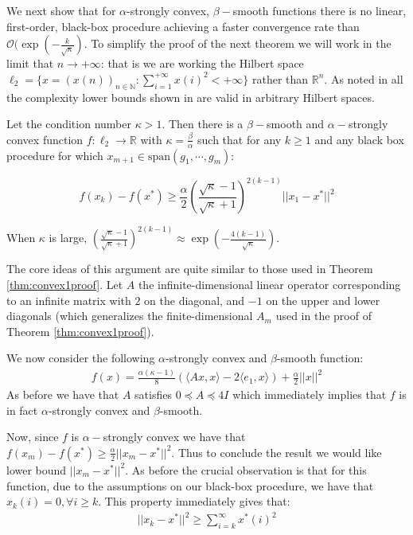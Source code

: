 We next show that for $\alpha$-strongly convex, $\beta-$smooth functions there is no linear, first-order, black-box procedure achieving a faster convergence rate than $\mathcal{O}(\exp(-\frac{k}{\sqrt{\kappa}})$. To simplify the proof of the next theorem we will work in the limit that $n \to +\infty$: that is we are working the Hilbert space $\ell_2 = \{ x = (x(n))_{n \in \mathbb{N}} : \sum_{i=1}^{+\infty} x(i)^2 < + \infty \}$ rather than $\mathbb{R}^n$. As noted in \citet{DBLP:journals/ftml/Bubeck15} all the complexity lower bounds shown in \citet{nesterov2004introductory} are valid in arbitrary Hilbert spaces.


\begin{theorem}
Let the condition number $\kappa > 1$. Then there is a $\beta-$smooth and $\alpha-$strongly convex function $f: \ell_2 \rightarrow \mathbb{R}$ with $\kappa = \frac{\beta}{\alpha}$ such that for any $k \geq 1$ and any black box procedure for which $x_{m+1} \in \text{span}(g_1, \cdots, g_m)$:

\begin{equation}
f(x_k) - f(x^*) \geq \frac{\alpha}{2} \left(\frac{ \sqrt{\kappa}-1}{\sqrt{\kappa}+1}\right)^{2(k-1)} ||x_1 - x^*||^2
\end{equation}

When $\kappa$ is large, $\left(\frac{ \sqrt{\kappa}-1}{\sqrt{\kappa}+1}\right)^{2(k-1)} \approx \exp( -\frac{4(k-1)}{\sqrt{\kappa}})$.
\end{theorem}

\proofstart

The core ideas of this argument are quite similar to those used in Theorem \ref{thm:convex1proof}. Let $A$ the infinite-dimensional linear operator corresponding to an infinite matrix with $2$ on the diagonal, and $-1$ on the upper and lower diagonals (which generalizes the finite-dimensional $A_m$ used in the proof of Theorem \ref{thm:convex1proof}). 

We now consider the following $\alpha$-strongly convex and $\beta$-smooth function:
\begin{align*}
f(x) = \frac{\alpha(\kappa-1)}{8} \left( \langle Ax, x \rangle - 2\langle e_1, x \rangle \right) + \frac{\alpha}{2}||x||^2
\end{align*}
As before we have that $A$ satisfies $0 \preceq A \preceq 4I$ which immediately implies that $f$ is in fact $\alpha$-strongly convex and $\beta$-smooth.

Now, since $f$ is $\alpha-$strongly convex we have that $f(x_m) - f(x^*) \geq \frac{\alpha}{2} || x_m - x^* ||^2$. Thus to conclude the result we would like lower bound $||x_m - x^*||^2$. As before the crucial observation is that for this function, due to the assumptions on our black-box procedure, we have that $x_{k}(i) = 0, \forall i \geq k$. This property immediately gives that:
\begin{align*}
||x_k - x^*||^2 \geq \sum_{i=k}^\infty x^*(i)^2
\end{align*}

